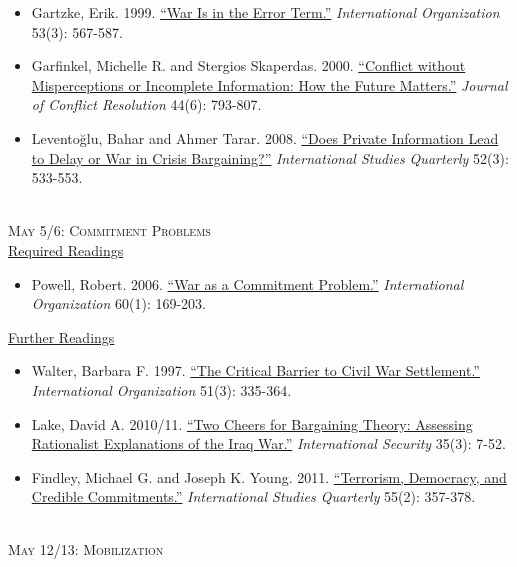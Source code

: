 \documentclass[11pt]{article}
\begin{document}
\begin{itemize}
\item Gartzke, Erik. 1999. \href{http://www.jstor.org/stable/2601290}{``War Is in the Error Term.''} \textit{International Organization} 53(3): 567-587.
\item Garfinkel, Michelle R. and Stergios Skaperdas. 2000. \href{http://jcr.sagepub.com/content/44/6/793.short}{``Conflict without Misperceptions or Incomplete Information: How the Future Matters.''} \textit{Journal of Conflict Resolution} 44(6): 793-807.
\item Levento\u{g}lu, Bahar and Ahmer Tarar. 2008. \href{http://www.jstor.org/stable/29734250}{``Does Private Information Lead to Delay or War in Crisis Bargaining?''} \textit{International Studies Quarterly} 52(3): 533-553.
\end{itemize}

~\\
\noindent \textsc{May 5/6: Commitment Problems} \\

\noindent \underline{Required Readings}

\begin{itemize}
\item Powell, Robert. 2006. \href{http://www.jstor.org/stable/3877871}{``War as a Commitment Problem.''} \textit{International Organization} 60(1): 169-203.
\end{itemize}

\noindent \underline{Further Readings}

\begin{itemize}
\item Walter, Barbara F. 1997. \href{http://www.jstor.org/stable/2703607}{``The Critical Barrier to Civil War Settlement.''} \textit{International Organization} 51(3): 335-364.
\item Lake, David A. 2010/11. \href{http://www.mitpressjournals.org/doi/abs/10.1162/ISEC_a_00029#.VorZipMrLdQ}{``Two Cheers for Bargaining Theory: Assessing Rationalist Explanations of the Iraq War.''} \textit{International Security} 35(3): 7-52.
\item Findley, Michael G. and Joseph K. Young. 2011. \href{http://onlinelibrary.wiley.com/doi/10.1111/j.1468-2478.2011.00647.x/full}{``Terrorism, Democracy, and Credible Commitments.''} \textit{International Studies Quarterly} 55(2): 357-378.
\end{itemize}

~\\
\noindent \textsc{May 12/13: Mobilization} \\
\end{document}
